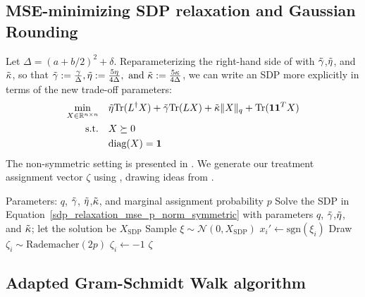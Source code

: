 \documentclass[12pt]{article}
\theoremstyle{definition}
\numberwithin{equation}{section}
\numberwithin{figure}{section}
\numberwithin{equation}{section}
\numberwithin{figure}{section}
\begin{document}
\subsection{MSE-minimizing SDP relaxation and Gaussian Rounding} \label{section_sdp}
Let $\Delta = (a + b/2)^2 + \delta.$ Reparameterizing the right-hand side of  with $\Tilde{\gamma}$,$\Tilde{\eta}$, and $\Tilde{\kappa}$, so that
$\Tilde{\gamma} := \frac{\gamma}{ \Delta}, \Tilde{\eta} := \frac{5\eta}{4\Delta} ,\text{ and } \Tilde{\kappa} := \frac{5\kappa}{4\Delta}$,
we can write an SDP more explicitly in terms of the new trade-off parameters:
\begin{align} \label{sdp_relaxation_mse_p_norm_symmetric}
    \min_{X\in\mathbb{R}^{n\times n}} \quad & \Tilde{\eta}\text{Tr}(L^\dagger X)  +   \Tilde{\gamma} \text{Tr}(L X) + \Tilde{\kappa}\|X\|_{q} + \operatorname{Tr}(\mathbf{1}\mathbf{1}^TX) \\
    \text{s.t.} \quad & X \succeq  0 \notag\\
    & \text{diag}(X) = \mathbf{1} \notag 
\end{align}
The non-symmetric setting is presented in .
We generate our treatment assignment vector $\zeta$ using , drawing ideas from  \citet{goemans1995improved}. 

\begin{algorithm}
\caption{\textsc{GaussianRounding}}
\label{alg:gaussian_round}
\begin{algorithmic}[1]
\Require Parameters: $q$, $\Tilde{\gamma}$, $\Tilde{\eta}$,$\Tilde{\kappa}$, and marginal assignment probability $p$ 
\State Solve the SDP in Equation~\eqref{sdp_relaxation_mse_p_norm_symmetric} with parameters $q$, $\Tilde{\gamma}$,$\Tilde{\eta}$, and $\Tilde{\kappa}$; let the solution be $X_{\mathrm{SDP}}$
\State Sample $\xi \sim \mathcal{N}(0, X_{\mathrm{SDP}})$ 
    \State $x_i' \gets \text{sgn}(\xi_i)$
        \State Draw $\zeta_i \sim \text{Rademacher}(2p)$ 
    \Else
        \State $\zeta_i \gets -1$
    \EndIf
\EndFor
\State \Return $\zeta$
\end{algorithmic}
\end{algorithm}

\subsection{Adapted Gram-Schmidt Walk algorithm} \label{covariate_balancing_comparisons}
\end{document}
